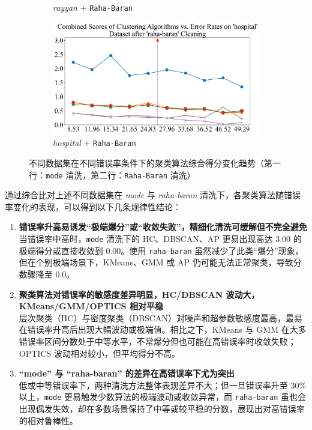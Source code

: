 \documentclass[10pt]{article} %
\numberwithin{equation}{section}
\begin{document}
\begin{figure}[htbp]
\begin{subfigure}{0.24\linewidth}
    \caption{\textit{rayyan} + \texttt{Raha-Baran}}
    \label{fig:raha_baran_rayyan}
  \end{subfigure}
  \hfill
  \begin{subfigure}{0.24\linewidth}
    \centering
    \includegraphics[width=\linewidth]{raha-baran_hospital_combined_scores.png}
    \caption{\textit{hospital} + \texttt{Raha-Baran}}
    \label{fig:raha_baran_hospital}
  \end{subfigure}

  \caption{不同数据集在不同错误率条件下的聚类算法综合得分变化趋势（第一行：\texttt{mode} 清洗，第二行：\texttt{Raha-Baran} 清洗）}
  \label{fig:all_combined_scores}
\end{figure}

\noindent

通过综合比对上述不同数据集在 \textit{mode} 与 \textit{raha-baran} 清洗下，各聚类算法随错误率变化的表现，可以得到以下几条规律性结论：

\begin{enumerate}
    \item \textbf{错误率升高易诱发“极端爆分”或“收敛失败”，精细化清洗可缓解但不完全避免} \\
    当错误率中高时，\texttt{mode} 清洗下的 HC、DBSCAN、AP 更易出现高达 3.00 的极端得分或直接收敛到 0.00。使用 \texttt{raha-baran} 虽然减少了此类“爆分”现象，但在个别极端场景下，KMeans、GMM 或 AP 仍可能无法正常聚类，导致分数骤降至 0.0。

    \item \textbf{聚类算法对错误率的敏感度差异明显，HC/DBSCAN 波动大，KMeans/GMM/OPTICS 相对平稳} \\
    层次聚类（HC）与密度聚类（DBSCAN）对噪声和超参数敏感度最高，最易在错误率升高后出现大幅波动或极端值。相比之下，KMeans 与 GMM 在大多错误率区间分数处于中等水平，不常爆分但也可能在高错误率时收敛失败；OPTICS 波动相对较小，但平均得分不高。

    \item \textbf{“mode” 与 “raha-baran” 的差异在高错误率下尤为突出} \\
    低或中等错误率下，两种清洗方法整体表现差异不大；但一旦错误率升至 30\% 以上，\texttt{mode} 更易触发少数算法的极端波动或收敛异常，而 \texttt{raha-baran} 虽也会出现偶发失效，却在多数场景保持了中等或较平稳的分数，展现出对高错误率的相对鲁棒性。
\end{enumerate}
\end{document}
